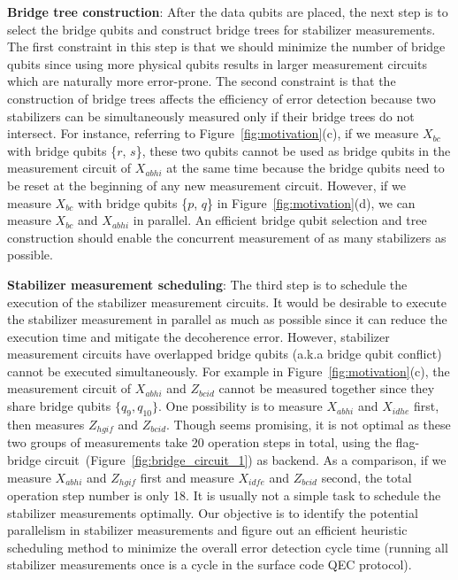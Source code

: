 \textbf{Bridge tree construction}: 
After the data qubits are placed, the next step is to select the bridge qubits and construct bridge trees for stabilizer measurements.
The first constraint in this step is that we should minimize the number of bridge qubits since using more physical qubits 
results in larger measurement circuits which are naturally more error-prone.
The second constraint is that the construction of bridge trees affects the efficiency of error detection because two stabilizers can be simultaneously measured only if their bridge trees do not intersect.
For instance, referring to Figure~\ref{fig:motivation}(c), if we measure $X_{bc}$ with bridge qubits \{$r$, $s$\}, these two qubits cannot be used as bridge qubits in the measurement circuit of $X_{abhi}$ at the same time because the bridge qubits need to be reset at the beginning of any new measurement circuit.
However, if we measure $X_{bc}$ with bridge qubits \{$p$, $q$\} in Figure~\ref{fig:motivation}(d), we can measure $X_{bc}$ and $X_{abhi}$ in parallel. An efficient bridge qubit selection and tree construction should enable the concurrent measurement of as many stabilizers as possible.





\textbf{Stabilizer measurement scheduling}:
The third step is to schedule the execution of the stabilizer measurement circuits.
It would be desirable to execute the stabilizer measurement in parallel as much as possible since it can reduce the execution time and mitigate the decoherence error. 
However, stabilizer measurement circuits have overlapped bridge qubits (a.k.a bridge qubit conflict) cannot be executed simultaneously. %
For example in Figure~\ref{fig:motivation}(c), the measurement circuit of $X_{abhi}$ and $Z_{bcid}$ cannot be measured together since they share bridge qubits $\{q_{9}, q_{10}\}$. 
One possibility is to measure $X_{abhi}$ and $X_{idhe}$ first, then measures $Z_{hgif}$ and $Z_{bcid}$. Though seems promising, it is not optimal as these two groups of measurements take 20 operation steps in total, using the flag-bridge circuit~\cite{Lao2020FaulttolerantQE}(Figure~\ref{fig:bridge_circuit_1}) as backend. As a comparison, if we measure $X_{abhi}$ and $Z_{hgif}$ first and measure $X_{idfe}$ and $Z_{bcid}$ second, the total operation step number is only 18. 
It is usually not a simple task to schedule the stabilizer measurements optimally.
Our objective is to identify the potential parallelism in stabilizer measurements and figure out an efficient heuristic scheduling method to minimize the overall error detection cycle time (running all stabilizer measurements once is a cycle in the surface code QEC protocol).













